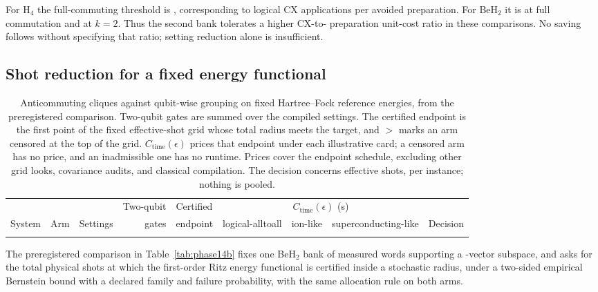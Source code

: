 \documentclass[aps,pra,reprint,superscriptaddress,nofootinbib,floatfix,
  showkeys]{revtex4-2}
\newcommand{\tightcolumns}{\setlength{\tabcolsep}{4pt}}
\begin{document}
For H$_4$ the full-commuting threshold is \cqcHFourCXRatio{}, corresponding to
\cqcHFourCXAvoided{} logical CX applications per avoided preparation. For
BeH$_2$ it is \cqcBeHCXRatio{} at full commutation and
\cqcBeHCXRatioWorst{} at $k=2$. Thus the second bank tolerates a higher CX-to-
preparation unit-cost ratio in these comparisons. No saving follows without
specifying that ratio; setting reduction alone is insufficient.

\subsection{Shot reduction for a fixed energy functional}

\begin{table}
  \caption{Anticommuting cliques against qubit-wise grouping on fixed
  Hartree--Fock reference energies, from the preregistered comparison.
  Two-qubit gates are summed over the compiled settings.  The certified
  endpoint is the first point of the fixed effective-shot grid whose total
  radius meets the target, and $>$ marks an arm censored at the top of the
  grid.  $C_{\mathrm{time}}(\epsilon)$ prices that endpoint under each
  illustrative card; a censored arm has no price, and an inadmissible one has no
  runtime. Prices cover the endpoint schedule, excluding other grid looks,
  covariance audits, and classical compilation. The decision concerns effective
  shots, per instance; nothing is
  pooled.}
  \label{tab:phase19}
  \footnotesize
  \tightcolumns
  \begin{ruledtabular}
  \begin{tabular}{llrrlrrrp{}}
  & & & Two-qubit & Certified & \multicolumn{3}{c}{$C_{\mathrm{time}}(\epsilon)$ (s)} & \\
  System & Arm & Settings & gates & endpoint & logical-alltoall & ion-like & superconducting-like & Decision \\
  \colrule
  
  \end{tabular}
  \end{ruledtabular}
\end{table}

The preregistered comparison in
Table~\ref{tab:phase14b} fixes one BeH$_2$ bank of \cqcBankWords{} measured
words supporting a \cqcBankBasis{}-vector subspace, and asks for the total
physical shots at which the first-order Ritz energy functional is certified
inside a stochastic radius, under a two-sided empirical Bernstein bound with a
declared family and failure probability, with the same allocation rule on both
arms.
\end{document}
